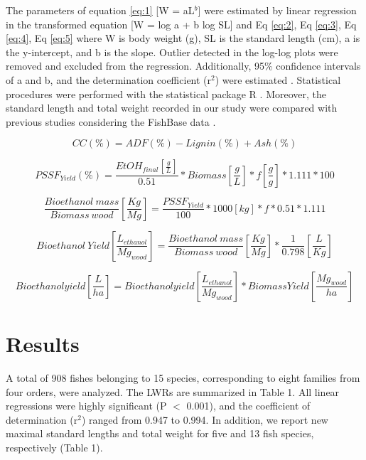 \documentclass[authoryear,preprint,review,12pt]{elsarticle} %
\begin{document}
The parameters of equation \ref{eq:1} [W = aL${}^{b}$] \citep{ricker1973linear} were estimated by linear regression in the transformed equation [W = log a + b log SL] and Eq \ref{eq:2}, Eq \ref{eq:3}, Eq \ref{eq:4}, Eq \ref{eq:5} where W is body weight (g), SL is the standard length (cm), a is the y-intercept, and b is the slope. Outlier detected in the log-log plots were removed and excluded from the regression. Additionally, 95\% confidence intervals of a and b, and the determination coefficient (r${}^{2}$) were estimated \citep{zar1999biostatistical}. Statistical procedures were performed with the statistical package R \citep{R_Core_Team}.   Moreover,  the standard length and total weight recorded in our study were compared with previous studies considering the FishBase data \citep{froese2016d}.



\begin{equation} 
\label{eq:1}
CC(\%) = ADF (\%) - Lignin(\%) + Ash(\%)
\end{equation}

\begin{equation} 
\label{eq:2}
PSSF_{Yield}(\%) = \frac{EtOH_{final}[\frac{g}{L}]}{0.51} * Biomass [\frac{g}{L}] * f [\frac{g}{g}] * 1.111 *100
\end{equation}

\begin{equation} 
\label{eq:3}
 \frac{Bioethanol \: mass}{Biomass \: wood} [\frac{Kg}{Mg}] = \frac{PSSF_{Yield}}{100}*1000 [kg]* f * 0.51 * 1.111
\end{equation}

\begin{equation} 
\label{eq:4}
Bioethanol \: Yield [\frac{L_{ethanol}}{Mg_{wood}}] = \frac{Bioethanol \: mass}{Biomass \: wood}[\frac{Kg}{Mg}]*\frac{1}{0.798}[\frac{L}{Kg}]
\end{equation}

\begin{equation} 
\label{eq:5}
Bioethanol  yield [\frac{L}{ha}] = Bioethanolyield [\frac{L_{ethanol}}{Mg_{wood}}]* BiomassYield[\frac{Mg_{wood}}{ha}]
\end{equation}


\section{ Results}

A total of 908 fishes belonging to 15 species, corresponding to eight families from four orders, were analyzed. The LWRs are summarized in Table 1. All linear regressions were highly significant (P $\mathrm{<}$ 0.001), and the coefficient of determination (r${}^{2}$) ranged from 0.947 to 0.994. In addition, we report new maximal standard lengths and total weight for five and 13 fish species, respectively (Table 1).
\end{document}
